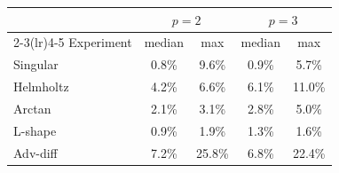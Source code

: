\begin{tabular}{lcccc}
\toprule
 & \multicolumn{2}{c}{$p=2$} & \multicolumn{2}{c}{$p=3$} \\
\cmidrule(lr){2-3}\cmidrule(lr){4-5}
Experiment & median & max & median & max \\
\midrule
Singular & 0.8\% & 9.6\% & 0.9\% & 5.7\% \\
Helmholtz & 4.2\% & 6.6\% & 6.1\% & 11.0\% \\
Arctan & 2.1\% & 3.1\% & 2.8\% & 5.0\% \\
L-shape & 0.9\% & 1.9\% & 1.3\% & 1.6\% \\
Adv-diff & 7.2\% & 25.8\% & 6.8\% & 22.4\% \\
\bottomrule
\end{tabular}

